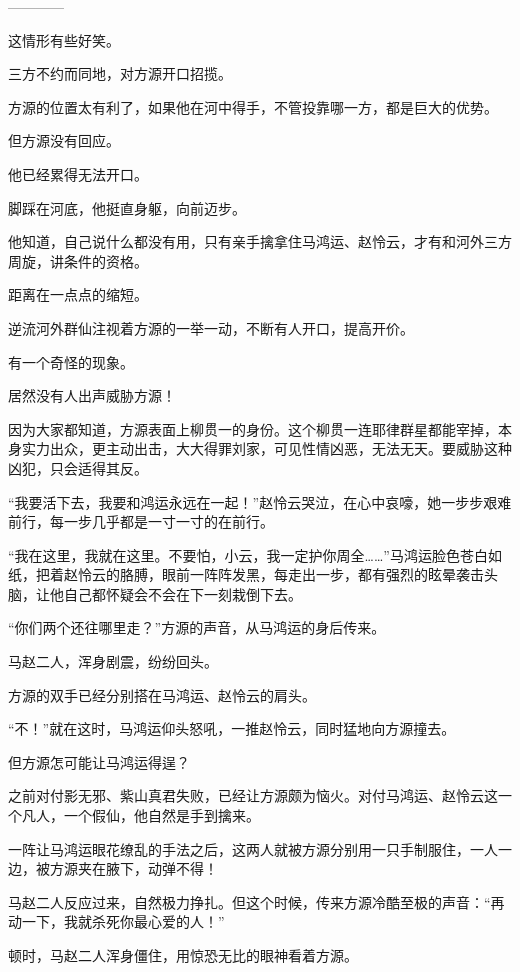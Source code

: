 
\begin{this_body}

------------

这情形有些好笑。

三方不约而同地，对方源开口招揽。

方源的位置太有利了，如果他在河中得手，不管投靠哪一方，都是巨大的优势。

但方源没有回应。

他已经累得无法开口。

脚踩在河底，他挺直身躯，向前迈步。

他知道，自己说什么都没有用，只有亲手擒拿住马鸿运、赵怜云，才有和河外三方周旋，讲条件的资格。

距离在一点点的缩短。

逆流河外群仙注视着方源的一举一动，不断有人开口，提高开价。

有一个奇怪的现象。

居然没有人出声威胁方源！

因为大家都知道，方源表面上柳贯一的身份。这个柳贯一连耶律群星都能宰掉，本身实力出众，更主动出击，大大得罪刘家，可见性情凶恶，无法无天。要威胁这种凶犯，只会适得其反。

“我要活下去，我要和鸿运永远在一起！”赵怜云哭泣，在心中哀嚎，她一步步艰难前行，每一步几乎都是一寸一寸的在前行。

“我在这里，我就在这里。不要怕，小云，我一定护你周全……”马鸿运脸色苍白如纸，把着赵怜云的胳膊，眼前一阵阵发黑，每走出一步，都有强烈的眩晕袭击头脑，让他自己都怀疑会不会在下一刻栽倒下去。

“你们两个还往哪里走？”方源的声音，从马鸿运的身后传来。

马赵二人，浑身剧震，纷纷回头。

方源的双手已经分别搭在马鸿运、赵怜云的肩头。

“不！”就在这时，马鸿运仰头怒吼，一推赵怜云，同时猛地向方源撞去。

但方源怎可能让马鸿运得逞？

之前对付影无邪、紫山真君失败，已经让方源颇为恼火。对付马鸿运、赵怜云这一个凡人，一个假仙，他自然是手到擒来。

一阵让马鸿运眼花缭乱的手法之后，这两人就被方源分别用一只手制服住，一人一边，被方源夹在腋下，动弹不得！

马赵二人反应过来，自然极力挣扎。但这个时候，传来方源冷酷至极的声音：“再动一下，我就杀死你最心爱的人！”

顿时，马赵二人浑身僵住，用惊恐无比的眼神看着方源。


\end{this_body}
